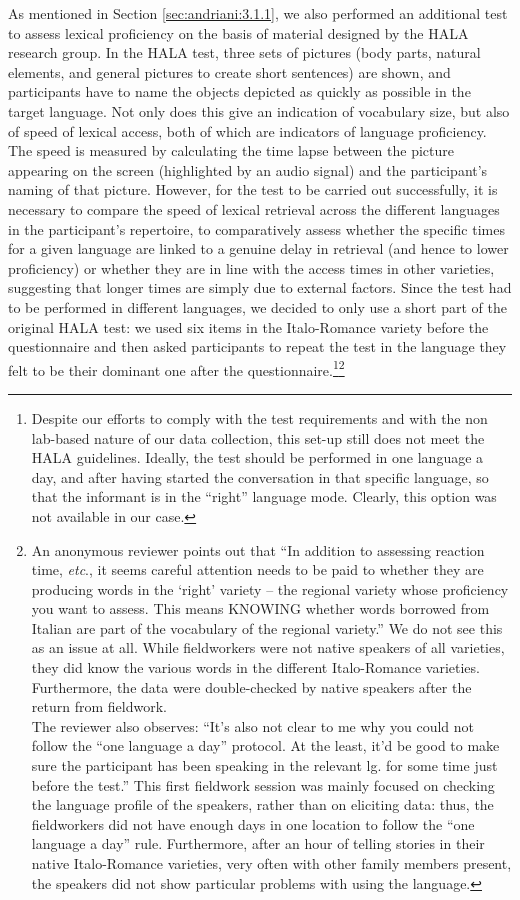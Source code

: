 \documentclass[output=paper,hidelinks]{langscibook}
\begin{document}
As mentioned in Section \ref{sec:andriani:3.1.1}, we also performed an additional test to assess lexical proficiency on the basis of material designed by the HALA research group. In the HALA test, three sets of pictures (body parts, natural elements, and general pictures to create short sentences) are shown, and participants have to name the objects depicted as quickly as possible in the target language. Not only does this give an indication of vocabulary size, but also of speed of lexical access, both of which are indicators of language proficiency. The speed is measured by calculating the time lapse between the picture appearing on the screen (highlighted by an audio signal) and the participant’s naming of that picture. However, for the test to be carried out successfully, it is necessary to compare the speed of lexical retrieval across the different languages in the participant’s repertoire, to comparatively assess whether the specific times for a given language are linked to a genuine delay in retrieval (and hence to lower proficiency) or whether they are in line with the access times in other varieties, suggesting that longer times are simply due to external factors. Since the test had to be performed in different languages, we decided to only use a short part of the original HALA test: we used six items in the Italo-Romance variety before the questionnaire and then asked participants to repeat the test in the language they felt to be their dominant one after the questionnaire.\footnote{Despite our efforts to comply with the test requirements and with the non lab-based nature of our data collection, this set-up still does not meet the HALA guidelines. Ideally, the test should be performed in one language a day, and after having started the conversation in that specific language, so that the informant is in the ``right'' language mode. Clearly, this option was not available in our case.}\footnote{An anonymous reviewer points out that ``In addition to assessing reaction time, \textit{etc}., it seems careful attention needs to be paid to whether they are producing words in the `right' variety -- the regional variety whose proficiency you want to assess. This means KNOWING whether words borrowed from Italian are part of the vocabulary of the regional variety.'' We do not see this as an issue at all. While fieldworkers were not native speakers of all varieties, they did know the various words in the different Italo-Romance varieties. Furthermore, the data were double-checked by native speakers after the return from fieldwork.\\The reviewer also observes: ``It’s also not clear to me why you could not follow the “one language a day” protocol. At the least, it’d be good to make sure the participant has been speaking in the relevant lg. for some time just before the test.'' This first fieldwork session was mainly focused on checking the language profile of the speakers, rather than on eliciting data: thus, the fieldworkers did not have enough days in one location to follow the ``one language a day'' rule. Furthermore, after an hour of telling stories in their native Italo-Romance varieties, very often with other family members present, the speakers did not show particular problems with using the language.}
\end{document}
